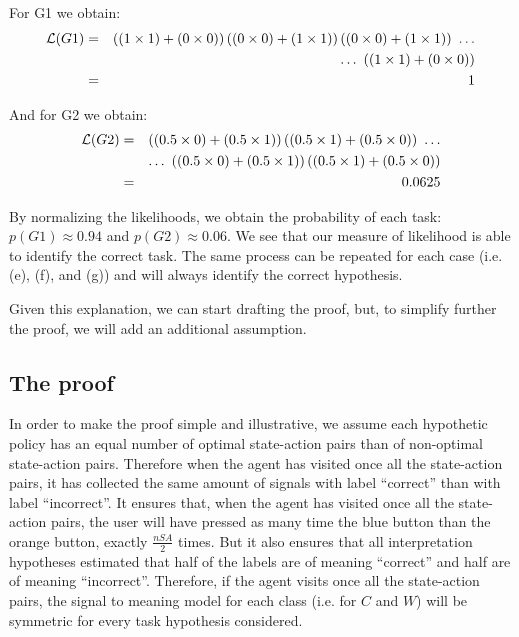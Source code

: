 For G1 we obtain:
%
\begin{eqnarray}
\mathcal{L}(G1) &=& \left((1\times1)+(0\times0)\right)\left((0\times0)+(1\times1)\right)\left((0\times0)+(1\times1)\right)~\ldots  \nonumber \\
&& \ldots~\left((1\times1)+(0\times0)\right)  \nonumber \\
&=& 1 \nonumber
\end{eqnarray}

And for G2 we obtain:
%
\begin{eqnarray}
\mathcal{L}(G2) &=& \left((0.5\times0)+(0.5\times1)\right)\left((0.5\times1)+(0.5\times0)\right)~\ldots  \nonumber \\
&& \ldots~\left((0.5\times0)+(0.5\times1)\right)\left((0.5\times1)+(0.5\times0)\right) \nonumber \\
&=& 0.0625 \nonumber
\end{eqnarray}

By normalizing the likelihoods, we obtain the probability of each task: $p(G1) \approx 0.94$ and $p(G2) \approx 0.06$. We see that our measure of likelihood is able to identify the correct task. The same process can be repeated for each case (i.e. (e), (f), and (g)) and will always identify the correct hypothesis.

Given this explanation, we can start drafting the proof, but, to simplify further the proof, we will add an additional assumption.

\subsection{The proof}

In order to make the proof simple and illustrative, we assume each hypothetic policy has an equal number of optimal state-action pairs than of non-optimal state-action pairs. Therefore when the agent has visited once all the state-action pairs, it has collected the same amount of signals with label ``correct'' than with label ``incorrect''. It ensures that, when the agent has visited once all the state-action pairs, the user will have pressed as many time the blue button than the orange button, exactly $\frac{nSA}{2}$ times. But it also ensures that all interpretation hypotheses estimated that half of the labels are of meaning ``correct'' and half are of meaning ``incorrect''. Therefore, if the agent visits once all the state-action pairs, the signal to meaning model for each class (i.e. for $C$ and $W$) will be symmetric for every task hypothesis considered. 


